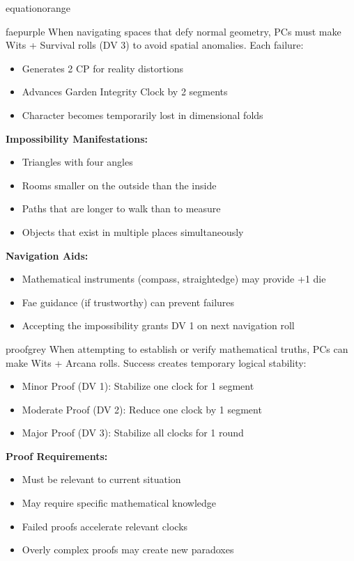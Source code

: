 \documentclass[11pt]{article}
\begin{document}
\begin{campaignsection}{equationorange}
\begin{mechanicbox}{faepurple}
When navigating spaces that defy normal geometry, PCs must make Wits + Survival rolls (DV 3) to avoid spatial anomalies. Each failure:
\begin{itemize}
    \item Generates 2 CP for reality distortions
    \item Advances Garden Integrity Clock by 2 segments
    \item Character becomes temporarily lost in dimensional folds
\end{itemize}
\textbf{Impossibility Manifestations:}
\begin{itemize}
    \item Triangles with four angles
    \item Rooms smaller on the outside than the inside
    \item Paths that are longer to walk than to measure
    \item Objects that exist in multiple places simultaneously
\end{itemize}
\textbf{Navigation Aids:}
\begin{itemize}
    \item Mathematical instruments (compass, straightedge) may provide +1 die
    \item Fae guidance (if trustworthy) can prevent failures
    \item Accepting the impossibility grants DV 1 on next navigation roll
\end{itemize}
\end{mechanicbox}

\begin{mechanicbox}{proofgrey}
When attempting to establish or verify mathematical truths, PCs can make Wits + Arcana rolls. Success creates temporary logical stability:
\begin{itemize}
    \item Minor Proof (DV 1): Stabilize one clock for 1 segment
    \item Moderate Proof (DV 2): Reduce one clock by 1 segment
    \item Major Proof (DV 3): Stabilize all clocks for 1 round
\end{itemize}
\textbf{Proof Requirements:}
\begin{itemize}
    \item Must be relevant to current situation
    \item May require specific mathematical knowledge
    \item Failed proofs accelerate relevant clocks
    \item Overly complex proofs may create new paradoxes
\end{itemize}
\end{mechanicbox}


\end{campaignsection}
\end{document}
